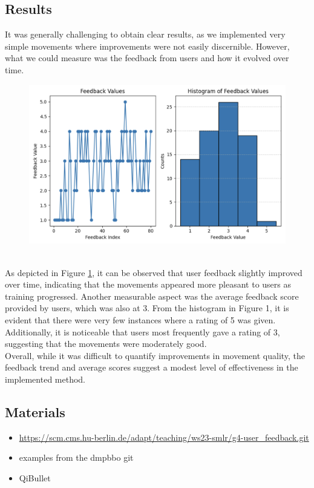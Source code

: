 \documentclass{article}
\begin{document}
\subsection{Results}
It was generally challenging to obtain clear results, as we implemented very simple movements where improvements were not easily discernible. However, what we could measure was the feedback from users and how it evolved over time.
\begin{figure}[h]
    \includegraphics[width=14cm]{results.png}
    \centering
    \label{111}
\end{figure}
\\
As depicted in Figure \ref{111}, it can be observed that user feedback slightly improved over time, indicating that the movements appeared more pleasant to users as training progressed.
Another measurable aspect was the average feedback score provided by users, which was also at 3. From the histogram in Figure 1, it is evident that there were very few instances where a rating of 5 was given.
Additionally, it is noticeable that users most frequently gave a rating of 3, suggesting that the movements were moderately good.
\\
Overall, while it was difficult to quantify improvements in movement quality, the feedback trend and average scores suggest a modest level of effectiveness in the implemented method.

\subsection{Materials}

\begin{itemize}
    \item \href{https://scm.cms.hu-berlin.de/adapt/teaching/ws23-smlr/g4-user_feedback.git}{https://scm.cms.hu-berlin.de/adapt/teaching/ws23-smlr/g4-user\_feedback.git}
    \item examples from the dmpbbo git~\cite{stulp2019dmpbbo}
    \item QiBullet~\cite{QiBullet}
\end{itemize}
\end{document}
